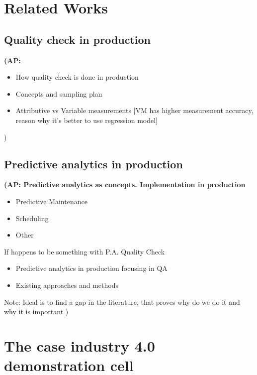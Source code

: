 \documentclass[5p,times,procedia]{elsarticle}
\newcommand{\AP}[1]{{\color{blue} {\bf (AP: #1)}}}
\begin{document}
\section{Related Works} %

\subsection{Quality check in production} %

\AP{
\begin{itemize}
\item How quality check is done in production
\item Concepts and sampling plan
\item Attributive vs Variable measurements [VM has higher measurement accuracy, reason why it’s better to use regression model]
\end{itemize}}

\subsection{Predictive analytics in production}

\AP{
Predictive analytics as concepts. Implementation in production
\begin{itemize}
       \item Predictive Maintenance
       \item Scheduling
       \item Other
\end{itemize}       
If happens to be something with P.A. Quality Check
\begin{itemize}
       \item	Predictive analytics in production focusing in QA
       \item	Existing approaches and methods
\end{itemize}      
Note: Ideal is to find a gap in the literature, that proves why do we do it and why it is important
}


\section{The case industry 4.0 demonstration cell} %
\end{document}
